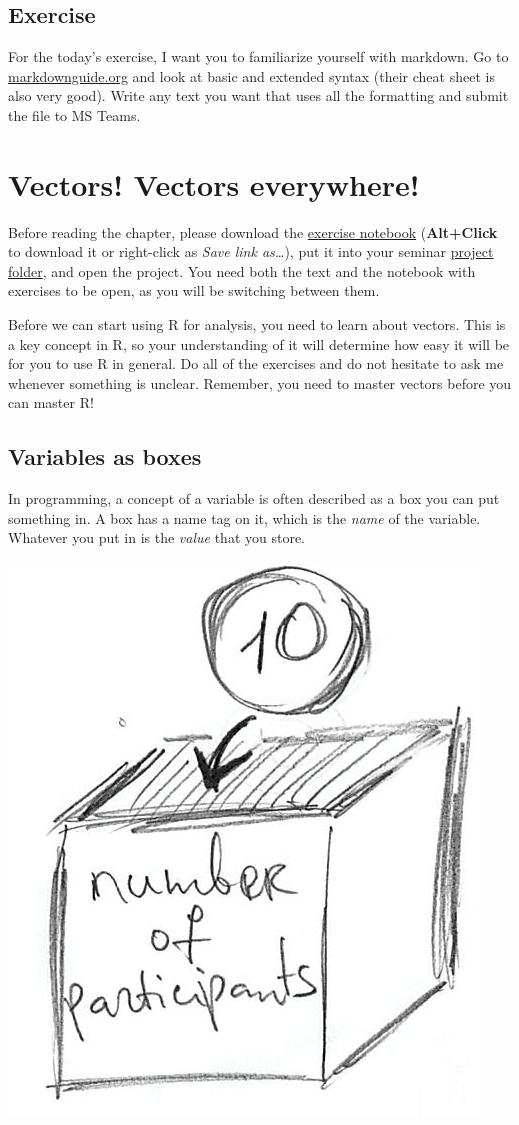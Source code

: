 \documentclass[
]{book}
\begin{document}
\hypertarget{exercise}{%
\section{Exercise}\label{exercise}}

For the today's exercise, I want you to familiarize yourself with markdown. Go to \href{https://www.markdownguide.org/}{markdownguide.org} and look at basic and extended syntax (their cheat sheet is also very good). Write any text you want that uses all the formatting and submit the file to MS Teams.

\hypertarget{vectors}{%
\chapter{Vectors! Vectors everywhere!}\label{vectors}}

Before reading the chapter, please download the \href{notebooks/Seminar\%2002\%20-\%20Vectors.Rmd}{exercise notebook} (\textbf{Alt+Click} to download it or right-click as \emph{Save link as\ldots{}}), put it into your seminar \protect\hyperlink{projects}{project folder}, and open the project. You need both the text and the notebook with exercises to be open, as you will be switching between them.

Before we can start using R for analysis, you need to learn about vectors. This is a key concept in R, so your understanding of it will determine how easy it will be for you to use R in general. Do all of the exercises and do not hesitate to ask me whenever something is unclear. Remember, you need to master vectors before you can master R!

\hypertarget{variables}{%
\section{Variables as boxes}\label{variables}}

In programming, a concept of a variable is often described as a box you can put something in. A box has a name tag on it, which is the \emph{name} of the variable. Whatever you put in is the \emph{value} that you store.

\begin{center}\includegraphics[width=0.3\linewidth]{images/variable-as-box} \end{center}
\end{document}
